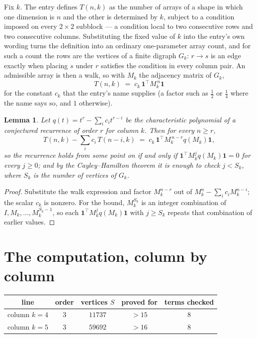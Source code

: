 \documentclass[11pt,a4paper]{article}
\theoremstyle{plain}
\newtheorem{lemma}[theorem]{Lemma}
\theoremstyle{definition}
\begin{document}
Fix $k$. The entry defines $T(n,k)$ as the number of arrays of a shape in which one dimension
is $n$ and the other is determined by $k$, subject to a condition imposed on every
$2\times2$ subblock --- a condition local to two consecutive rows and two consecutive columns.
Substituting the fixed value of $k$ into the entry's own wording turns the definition into an
ordinary one-parameter array count, and for such a count the rows are the vertices of a finite
digraph $G_k$: $r\to s$ is an edge exactly when placing $s$ under $r$ satisfies the condition
in every column pair. An admissible array is then a walk, so with $M_k$ the adjacency matrix
of $G_k$,
\[
T(n,k)\;=\;c_k\,\mathbf{1}^{\!\top}M_k^{\,n}\mathbf{1}
\]
for the constant $c_k$ that the entry's name supplies (a factor such as $\tfrac12$ or
$\tfrac14$ where the name says so, and $1$ otherwise).

\begin{lemma}\label{lem:crit}
Let $q(t)=t^{r}-\sum_i c_it^{r-i}$ be the characteristic polynomial of a conjectured
recurrence of order $r$ for column $k$. Then for every $n\ge r$,
\[
T(n,k)-\sum_i c_i\,T(n-i,k)\;=\;c_k\,\mathbf{1}^{\!\top}M_k^{\,n-r}q(M_k)\mathbf{1},
\]
so the recurrence holds from some point on if and only if
$\mathbf{1}^{\!\top}M_k^{j}q(M_k)\mathbf{1}=0$ for every $j\ge0$; and by the
Cayley--Hamilton theorem it is enough to check $j<S_k$, where $S_k$ is the number of vertices
of $G_k$.
\end{lemma}

\begin{proof}
Substitute the walk expression and factor $M_k^{n-r}$ out of $M_k^{n}-\sum_ic_iM_k^{n-i}$;
the scalar $c_k$ is nonzero. For the bound, $M_k^{S_k}$ is an integer combination of
$I,M_k,\dots,M_k^{S_k-1}$, so each $\mathbf{1}^{\!\top}M_k^{j}q(M_k)\mathbf{1}$ with
$j\ge S_k$ repeats that combination of earlier values.
\end{proof}

\section{The computation, column by column}

\begin{center}
\begin{tabular}{ccccc}
line & order & vertices $S$ & proved for & terms checked \\ \hline
column $k$$=4$ & $3$ & $11737$ & $>15$ & $8$ \\
column $k$$=5$ & $3$ & $59692$ & $>16$ & $8$ \\
\end{tabular}
\end{center}
\end{document}
